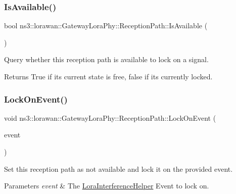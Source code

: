 \subsubsection{\texorpdfstring{Is\+Available()}{IsAvailable()}}
{\footnotesize\ttfamily bool ns3\+::lorawan\+::\+Gateway\+Lora\+Phy\+::\+Reception\+Path\+::\+Is\+Available (\begin{DoxyParamCaption}\item[{void}]{ }\end{DoxyParamCaption})}

Query whether this reception path is available to lock on a signal.

\begin{DoxyReturn}{Returns}
True if its current state is free, false if it\textquotesingle{}s currently locked. 
\end{DoxyReturn}
\mbox{\label{classns3_1_1lorawan_1_1GatewayLoraPhy_1_1ReceptionPath_af914d04203919ae4ad11ee49f06fb98d}} 
\subsubsection{\texorpdfstring{Lock\+On\+Event()}{LockOnEvent()}}
{\footnotesize\ttfamily void ns3\+::lorawan\+::\+Gateway\+Lora\+Phy\+::\+Reception\+Path\+::\+Lock\+On\+Event (\begin{DoxyParamCaption}\item[{Ptr$<$ \hyperlink{classns3_1_1lorawan_1_1LoraInterferenceHelper_1_1Event}{Lora\+Interference\+Helper\+::\+Event} $>$}]{event }\end{DoxyParamCaption})}

Set this reception path as not available and lock it on the provided event.


\begin{DoxyParams}{Parameters}
{\em event} & The \hyperlink{classns3_1_1lorawan_1_1LoraInterferenceHelper}{Lora\+Interference\+Helper} Event to lock on. \\
\hline
\end{DoxyParams}
\mbox{\label{classns3_1_1lorawan_1_1GatewayLoraPhy_1_1ReceptionPath_aed06f1f101a3f12d539c04aad94bc381}} 
